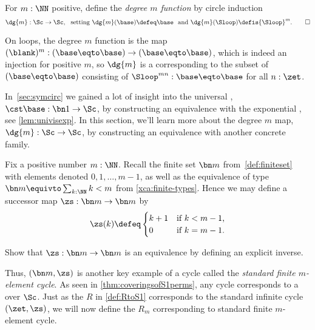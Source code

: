 \begin{definition}\label{def:mfoldS1cover}
For $m:\NN$ positive, define the \emph{degree $m$ function} by circle induction
\[
\dg{m}:\Sc\to \Sc, \text{~~setting~}
\dg{m}(\base)\defeq\base \text{~~and~}
\dg{m}(\Sloop)\defis{\Sloop}^m.\qedhere
\]
\end{definition}
On loops, the degree $m$ function is the map
$(\blank)^m : (\base\eqto \base) \to (\base\eqto \base)$,
which is indeed an injection for positive $m$,
so $\dg{m}$ is a \covering corresponding to the subset of $(\base\eqto \base)$ consisting
of ${\Sloop}^{mn} : \base\eqto \base$ for all $n:\zet$.

In~\cref{sec:symcirc} we gained a lot of insight into
the universal \covering, $\cst\base:\bn 1\to\Sc$,
by constructing an equivalence with the exponential \covering,
see \cref{lem:univisexp}.
In this section, we'll learn more about the degree $m$ map,
$\dg{m}:\Sc\to\Sc$,
by constructing an equivalence with another concrete family.

Fix a positive number $m:\NN$. Recall the finite set $\bn m$
from~\cref{def:finiteset} with elements denoted $0,1,\dots,m-1$,
as well as the equivalence of type $\bn m \equivto \sum_{k:\NN}k<m$
from \cref{xca:finite-types}.
Hence we may define a successor map $\zs : \bn m \to \bn m$ by
\[
  \zs(k) \defeq
  \begin{cases}
    k+1 & \text{if $k<m-1$,} \\
    0   & \text{if $k=m-1$.}
  \end{cases}
\]
\begin{exercise}
  Show that $\zs : \bn m \to \bn m$ is an equivalence by defining
  an explicit inverse.
\end{exercise}
Thus, $(\bn m,\zs)$ is another key example of a cycle called
the \emph{standard finite $m$-element cycle}.
As seen in \cref{thm:coveringsofS1perms},
any cycle corresponds to a \covering over $\Sc$.
Just as the \covering $R$ in \cref{def:RtoS1} corresponds to
the standard infinite cycle $(\zet,\zs)$,
we will now define the \covering $R_m$ corresponding to
standard finite $m$-element cycle.

